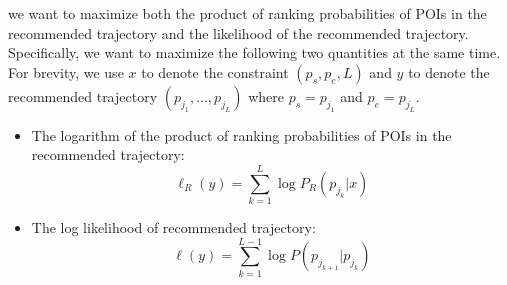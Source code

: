 we want to maximize both the product of ranking probabilities of POIs in the recommended trajectory and
the likelihood of the recommended trajectory.
Specifically, we want to maximize the following two quantities at the same time.
For brevity, we use $x$ to denote the constraint $(p_s, p_e, L)$ and $y$ to denote the
recommended trajectory $(p_{j_1}, \dots, p_{j_L})$ where $p_s = p_{j_1}$ and $p_e = p_{j_L}$.
\begin{itemize}
\item The logarithm of the product of ranking probabilities of POIs in the recommended trajectory:
      \begin{displaymath}
          \ell_R(y) = \sum_{k=1}^L \log P_R(p_{j_k} | x)
      \end{displaymath}
\item The log likelihood of recommended trajectory:
      \begin{displaymath}
          \ell(y) = \sum_{k=1}^{L-1} \log P(p_{j_{k+1}} | p_{j_k})
      \end{displaymath}
\end{itemize}

